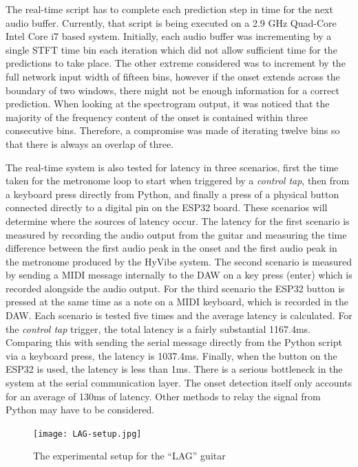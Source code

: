 \documentclass[conference]{IEEEtran}
\begin{document}
The real-time script has to complete each prediction step in time for the next audio buffer. Currently, that script is being executed on a 2.9 GHz Quad-Core Intel Core i7 based system. Initially, each audio buffer was incrementing
by a single STFT time bin each iteration which did not allow sufficient time for the predictions to take place. The other extreme considered was to increment by the full network input width of fifteen bins, however if the onset extends
across the boundary of two windows, there might not be enough information for a correct prediction. When looking at the spectrogram output, it was noticed that the majority of the frequency content of the onset is contained within three 
consecutive bins. Therefore, a compromise was made of iterating twelve bins so that there is always an overlap of three.

The real-time system is also tested for latency in three scenarios, first the time taken for the metronome loop to start when triggered by a \emph{control tap}, then from a keyboard press directly from Python, and finally a press of a physical button connected directly to a digital pin on the ESP32 board. 
These scenarios will determine where the sources of latency occur. The latency for the first scenario is measured by recording the audio output from the guitar and measuring the time difference between the first audio peak in the onset and the first audio peak in the metronome produced by the HyVibe system.
The second scenario is measured by sending a MIDI message internally to the DAW on a key press (enter) which is recorded alongside the audio output. For the third scenario the ESP32 button is pressed at the same time as a note on a MIDI keyboard, which is recorded in the DAW. 
Each scenario is tested five times and the average latency is calculated. For the \emph{control tap} trigger, the total latency is a fairly substantial 1167.4ms. Comparing this with sending
the serial message directly from the Python script via a keyboard press, the latency is 1037.4ms. Finally, when the button on the ESP32 is used, the latency is less than 1ms.
There is a serious bottleneck in the system at the serial communication layer. The onset detection itself only accounts for an average of 130ms of latency. Other methods to relay the signal
from Python may have to be considered.

\begin{figure}[htbp]
    \centerline{\texttt{[image: LAG-setup.jpg]}}
    \caption{The experimental setup for the ``LAG'' guitar}
    \label{acoustic-bridge}
    \end{figure}
\end{document}
